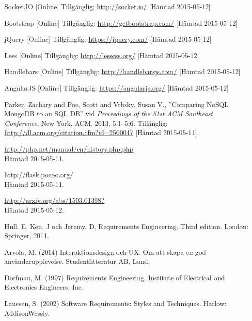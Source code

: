 \vspace{-15mm}
\renewcommand{\refname}{}
\begin{thebibliography}{9}

Socket.IO [Online] Tillgänglig: 
\url{http://socket.io/} [Hämtad 2015-05-12]

Bootstrap [Online] Tillgänglig: 
\url{http://getbootstrap.com/} [Hämtad 2015-05-12]

jQuery [Online] Tillgänglig: 
\url{https://jquery.com/} [Hämtad 2015-05-12]

Less [Online] Tillgänglig: 
\url{http://lesscss.org/} [Hämtad 2015-05-12]

Handlebars [Online] Tillgänglig: 
\url{http://handlebarsjs.com/} [Hämtad 2015-05-12]

AngularJS [Online] Tillgänglig: 
\url{https://angularjs.org/} [Hämtad 2015-05-12]

 Parker, Zachary and Poe, Scott and Vrbsky, Susan V., ''Comparing NoSQL MongoDB to an SQL DB'' vid \textit{Proceedings of the 51st ACM Southeast Conference}, New York, ACM, 2013, 5:1--5:6. Tillänglig: \url{http://dl.acm.org/citation.cfm?id=2500047} [Hämtad 2015-05-11].

\url{http://php.net/manual/en/history.php.php}\\
Hämtad 2015-05-11.
	
\url{http://flask.pocoo.org/}\\
Hämtad 2015-05-11.
	
\url{http://arxiv.org/abs/1503.01398?}\\
Hämtad 2015-05-12.

Hull. E, Ken. J och Jeremy. D, Requirements Engineering, Third edition. London: Springer, 2011.

Arvola, M. (2014) Interaktionsdesign och UX: Om att skapa en god användarupplevelse. Studentlitteratur AB, Lund.

Dorfman, M. (1997) Requirements Engineering. Institute of Electrical and Electronics Engineers, Inc. 

Lauesen, S. (2002) Software Requirements: Styles and Techniques. Harlow: AddisonWessly.

	


\end{thebibliography}
